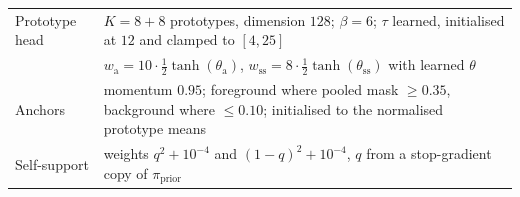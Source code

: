 \documentclass{ieeeaccess}
\begin{document}
\begin{table}[!t]
\begin{tabular}{@{}l p{}@{}}
    Prototype head & $K=8+8$ prototypes, dimension $128$; $\beta=6$; $\tau$ learned, initialised at $12$ and clamped to $[4,25]$ \\
    & $w_{\text{a}}=10\cdot\tfrac12\tanh(\theta_{\text{a}})$, $w_{\text{ss}}=8\cdot\tfrac12\tanh(\theta_{\text{ss}})$ with learned $\theta$ \\
    Anchors & momentum $0.95$; foreground where pooled mask $\ge0.35$, background where $\le0.10$; initialised to the normalised prototype means \\
    Self-support & weights $q^2+10^{-4}$ and $(1-q)^2+10^{-4}$, $q$ from a stop-gradient copy of $\pi_{\text{prior}}$ \\
    \bottomrule
  \end{tabular}
\end{table}
\end{document}

